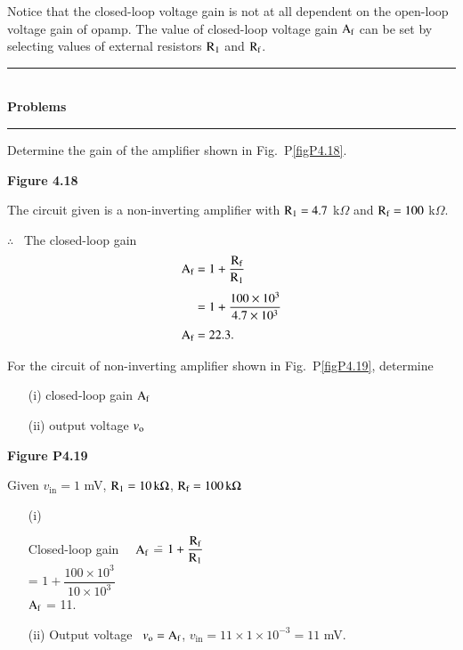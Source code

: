 Notice that the closed-loop voltage gain is not at all dependent on the open-loop voltage gain of opamp. The value of closed-loop voltage gain $\textrm{A}_{\textrm{f}}$ can be set by selecting values of external resistors $\textrm{R}_{1}$ and $\textrm{R}_{\textrm{f}}$.

\begin{center}
\rule{4cm}{1pt}\\
{\bf\Large Problems}\\[-3pt]
\rule{4cm}{1pt}
\end{center}

\begin{problem}\label{prob4.18}
Determine the gain of the amplifier shown in Fig.~P\ref{figP4.18}.
\begin{center}
{\bf Figure 4.18}
\end{center}
\end{problem}

\begin{solution}
The circuit given is a non-inverting amplifier with $\textrm{R}_{1}=4.7$ k$\Omega$ and $\textrm{R}_{\textrm{f}}=100$ k$\Omega$.

$\therefore$~ The closed-loop gain
\begin{align*}
\textrm{A}_{\textrm{f}} &= 1+\frac{\textrm{R}_{\textrm{f}}}{\textrm{R}_{1}}\\[3pt]
          &= 1+\frac{100\times 10^{3}}{4.7\times 10^{3}}\\[3pt]
\textrm{A}_{\textrm{f}} &= 22.3.
\end{align*}
\end{solution}

\begin{problem}\label{prob4.19}
For the circuit of non-inverting amplifier shown in Fig.~P\ref{figP4.19}, determine
\begin{itemize}
\item[(i)] closed-loop gain $\textrm{A}_{\textrm{f}}$

\item[(ii)] output voltage $v_{\textrm{o}}$
\end{itemize}
\begin{center}
{\bf Figure P4.19}
\end{center}
\end{problem}

\begin{solution}
Given $v_{\text{in}}=1$ mV, $\textrm{R}_{1}=10\,\textrm{k} \Omega$, $\textrm{R}_{\textrm{f}}=100\,\textrm{k}\Omega$
\begin{itemize}
\item[(i)] 
\begin{tabbing}
Closed-loop gain~~ $\textrm{A}_{\textrm{f}}$ \== $1+\dfrac{\textrm{R}_{\textrm{f}}}{\textrm{R}_{1}}$\\[4pt]
                                \>= $1+\dfrac{100\times 10^{3}}{10\times 10^{3}}$\\[4pt]
\phantom{aaaaaaaaaaqqqqqq,}$\textrm{A}_{\textrm{f}}$ \>= 11.
\end{tabbing}

\item[(ii)] Output voltage~ $v_{\textrm{o}}=\textrm{A}_{\textrm{f}}$, $v_{\text{in}}=11\times 1\times 10^{-3}=11$ mV.
\end{itemize}
\end{solution}

